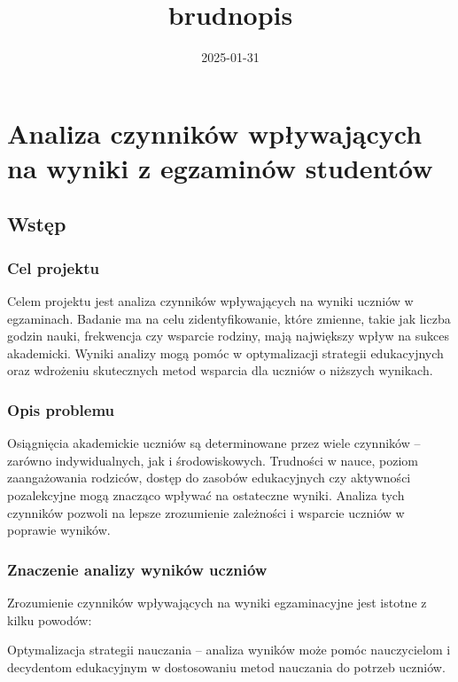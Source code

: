 \documentclass[
]{article}
\title{brudnopis}
\author{}
\date{\vspace{-2.5em}2025-01-31}
\begin{document}
\maketitle

\section{Analiza czynników wpływających na wyniki z egzaminów
studentów}\label{analiza-czynnikuxf3w-wpux142ywajux105cych-na-wyniki-z-egzaminuxf3w-studentuxf3w}

\subsection{Wstęp}\label{wstux119p}

\subsubsection{Cel projektu}\label{cel-projektu}

Celem projektu jest analiza czynników wpływających na wyniki uczniów w
egzaminach. Badanie ma na celu zidentyfikowanie, które zmienne, takie
jak liczba godzin nauki, frekwencja czy wsparcie rodziny, mają
największy wpływ na sukces akademicki. Wyniki analizy mogą pomóc w
optymalizacji strategii edukacyjnych oraz wdrożeniu skutecznych metod
wsparcia dla uczniów o niższych wynikach.

\subsubsection{Opis problemu}\label{opis-problemu}

Osiągnięcia akademickie uczniów są determinowane przez wiele czynników
-- zarówno indywidualnych, jak i środowiskowych. Trudności w nauce,
poziom zaangażowania rodziców, dostęp do zasobów edukacyjnych czy
aktywności pozalekcyjne mogą znacząco wpływać na ostateczne wyniki.
Analiza tych czynników pozwoli na lepsze zrozumienie zależności i
wsparcie uczniów w poprawie wyników.

\subsubsection{Znaczenie analizy wyników
uczniów}\label{znaczenie-analizy-wynikuxf3w-uczniuxf3w}

Zrozumienie czynników wpływających na wyniki egzaminacyjne jest istotne
z kilku powodów:

Optymalizacja strategii nauczania -- analiza wyników może pomóc
nauczycielom i decydentom edukacyjnym w dostosowaniu metod nauczania do
potrzeb uczniów.
\end{document}
